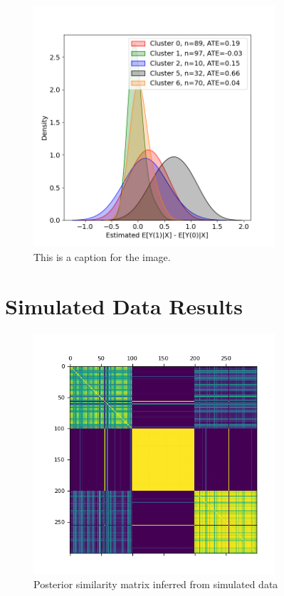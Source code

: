 \documentclass{article}
\begin{document}
\begin{figure}[h]
  \centering
  \includegraphics[width=0.8\textwidth]{Plots/NSW_output_histogram.png}
  \caption{This is a caption for the image.}
  \label{fig:sim_data_info}
\end{figure}

\section{Simulated Data Results}

\begin{figure}[H]
  \centering
  \includegraphics[width=0.8\textwidth]{Plots/Simulated Posterior Similarity Matrix.png}
  \caption{Posterior similarity matrix inferred from simulated data}
  \label{fig:sim_post_mat}
\end{figure}
\end{document}

